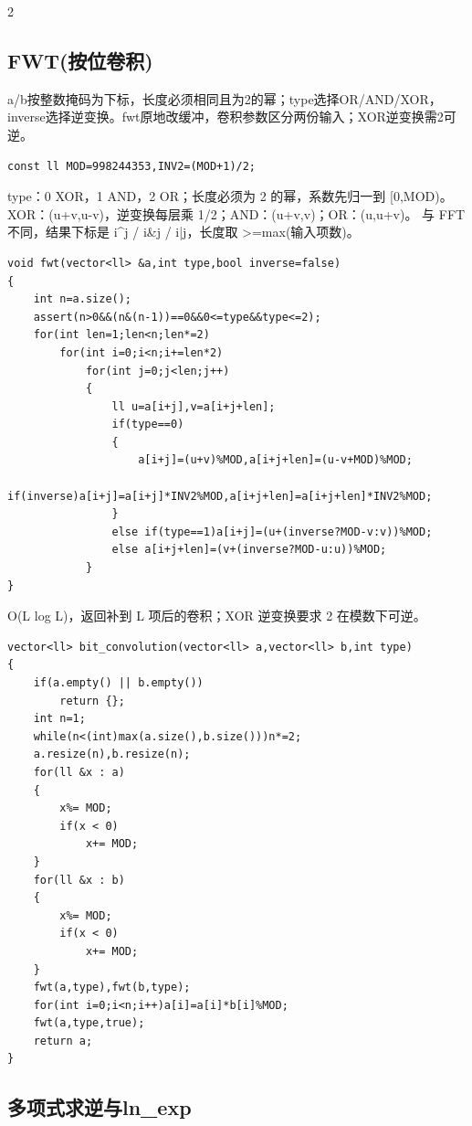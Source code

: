 \documentclass[UTF8,fontset=fandol,a4paper,twoside]{ctexart}
\newcommand{\note}[1]{{\fontsize{10}{12}\selectfont #1\par}}
\begin{document}
\begin{multicols}{2}
\subsection{FWT(按位卷积)}

\note{a/\allowbreak{}b按整数掩码为下标，长度必须相同且为2的幂；type选择OR/\allowbreak{}AND/\allowbreak{}XOR，inverse选择逆变换。fwt原地改缓冲，卷积参数区分两份输入；XOR逆变换需2可逆。}
\begin{lstlisting}
const ll MOD=998244353,INV2=(MOD+1)/2;
\end{lstlisting}
\note{type：0 XOR，1 AND，2 OR；长度必须为 2 的幂，系数先归一到 [\allowbreak{}0,\allowbreak{}MOD)\allowbreak{}。 XOR：(\allowbreak{}u+\allowbreak{}v,\allowbreak{}u-\allowbreak{}v)\allowbreak{}，逆变换每层乘 1/\allowbreak{}2；AND：(\allowbreak{}u+\allowbreak{}v,\allowbreak{}v)\allowbreak{}；OR：(\allowbreak{}u,\allowbreak{}u+\allowbreak{}v)\allowbreak{}。 与 FFT 不同，结果下标是 i\textasciicircum{}j /\allowbreak{} i\&j /\allowbreak{} i|j，长度取 >\allowbreak{}=\allowbreak{}max(\allowbreak{}输入项数)\allowbreak{}。}
\begin{lstlisting}
void fwt(vector<ll> &a,int type,bool inverse=false)
{
    int n=a.size();
    assert(n>0&&(n&(n-1))==0&&0<=type&&type<=2);
    for(int len=1;len<n;len*=2)
        for(int i=0;i<n;i+=len*2)
            for(int j=0;j<len;j++)
            {
                ll u=a[i+j],v=a[i+j+len];
                if(type==0)
                {
                    a[i+j]=(u+v)%MOD,a[i+j+len]=(u-v+MOD)%MOD;
                    if(inverse)a[i+j]=a[i+j]*INV2%MOD,a[i+j+len]=a[i+j+len]*INV2%MOD;
                }
                else if(type==1)a[i+j]=(u+(inverse?MOD-v:v))%MOD;
                else a[i+j+len]=(v+(inverse?MOD-u:u))%MOD;
            }
}
\end{lstlisting}
\note{O(\allowbreak{}L log L)\allowbreak{}，返回补到 L 项后的卷积；XOR 逆变换要求 2 在模数下可逆。}
\begin{lstlisting}
vector<ll> bit_convolution(vector<ll> a,vector<ll> b,int type)
{
    if(a.empty() || b.empty())
        return {};
    int n=1;
    while(n<(int)max(a.size(),b.size()))n*=2;
    a.resize(n),b.resize(n);
    for(ll &x : a)
    {
        x%= MOD;
        if(x < 0)
            x+= MOD;
    }
    for(ll &x : b)
    {
        x%= MOD;
        if(x < 0)
            x+= MOD;
    }
    fwt(a,type),fwt(b,type);
    for(int i=0;i<n;i++)a[i]=a[i]*b[i]%MOD;
    fwt(a,type,true);
    return a;
}
\end{lstlisting}
\subsection{多项式求逆与ln\_exp}


\end{multicols}
\end{document}

